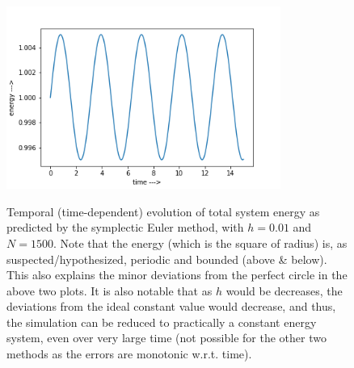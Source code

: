 \documentclass{report}
\begin{document}
\begin{figure}[H]
	\centering
	\includegraphics[width = 0.8\textwidth]{eulerEN.png}
	\label{eulerenergy}
	\caption{Temporal (time-dependent) evolution of total system energy as predicted by the symplectic Euler method, with $h=0.01$ and $N=1500$. Note that the energy (which is the square of radius) is, as suspected/hypothesized, periodic and bounded (above \& below). This also explains the minor deviations from the perfect circle in the above two plots. It is also notable that as $h$ would be decreases, the deviations from the ideal constant value would decrease, and thus, the simulation can be reduced to practically a constant energy system, even over very large time (not possible for the other two methods as the errors are monotonic w.r.t. time).}
\end{figure}
\pagebreak
\end{document}
